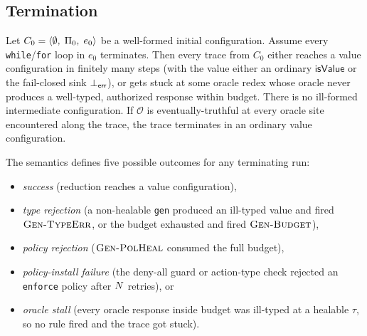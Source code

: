 \subsection{Termination}
\label{app:term}

\begin{theorem}[Termination]
\label{thm:pact-term}
Let $C_0 = \langle \emptyset,\; \Pi_0,\; e_0 \rangle$ be a well-formed initial configuration. Assume every \texttt{while}/\texttt{for} loop in $e_0$ terminates. Then every trace from $C_0$ either reaches a value configuration in finitely many steps (with the value either an ordinary $\mathsf{isValue}$ or the fail-closed sink $\bot_{\mathsf{err}}$), or gets stuck at some oracle redex whose oracle never produces a well-typed, authorized response within budget. There is no ill-formed intermediate configuration. If $\mathcal{O}$ is eventually-truthful at every oracle site encountered along the trace, the trace terminates in an ordinary value configuration.
\end{theorem}

The semantics defines five possible outcomes for any terminating run:
\begin{itemize}
  \item \emph{success} (reduction reaches a value configuration),
  \item \emph{type rejection} (a non-healable \texttt{gen} produced an ill-typed value and fired $\textsc{Gen-TypeErr}$, or the budget exhausted and fired $\textsc{Gen-Budget}$),
  \item \emph{policy rejection} ($\textsc{Gen-PolHeal}$ consumed the full budget),
  \item \emph{policy-install failure} (the deny-all guard or action-type check rejected an \texttt{enforce} policy after $N$ retries), or
  \item \emph{oracle stall} (every oracle response inside budget was ill-typed at a healable $\tau$, so no rule fired and the trace got stuck).
\end{itemize}


